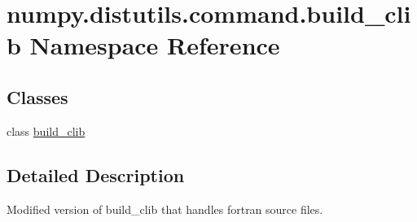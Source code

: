 \hypertarget{namespacenumpy_1_1distutils_1_1command_1_1build__clib}{}\section{numpy.\+distutils.\+command.\+build\+\_\+clib Namespace Reference}
\label{namespacenumpy_1_1distutils_1_1command_1_1build__clib}
\subsection*{Classes}
\begin{DoxyCompactItemize}
\item 
class \hyperlink{classnumpy_1_1distutils_1_1command_1_1build__clib_1_1build__clib}{build\+\_\+clib}
\end{DoxyCompactItemize}


\subsection{Detailed Description}
\begin{DoxyVerb}Modified version of build_clib that handles fortran source files.
\end{DoxyVerb}
 